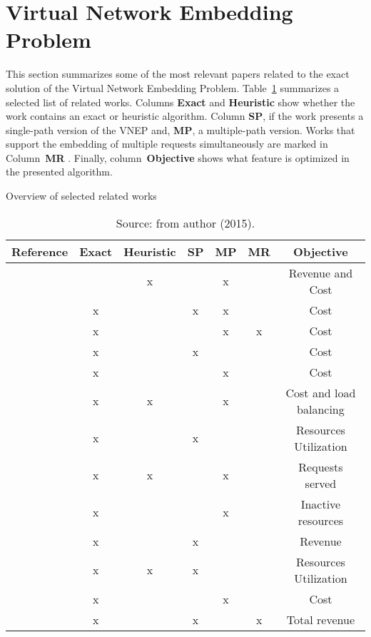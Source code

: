 \section{Virtual Network Embedding Problem}
\label{sec:relvnep}
This section summarizes some of the most relevant papers related to the exact solution of the Virtual Network Embedding Problem. 
Table~\ref{tab:papers} summarizes a selected list of related works.
Columns \textbf{Exact} and \textbf{Heuristic} show whether the work contains an exact or heuristic algorithm.
Column \textbf{SP}, if the work presents a single-path version of the VNEP and, \textbf{MP}, a multiple-path version.
Works that support the embedding of multiple requests simultaneously are marked in Column~\textbf{MR} .
Finally, column~\textbf{Objective} shows what feature is optimized in the presented algorithm.

\begin{table}[h]
\begin{center}
  \footnotesize
  \caption{Overview of selected related works\label{tab:papers}}
  \begin{tabular}{l | c c | c c | c | c}
  \hline
  Reference                 & Exact  & Heuristic  & SP  &  MP  & MR & Objective \\
  \hline
   \citet{Yu2008}           &        & x          &     & x    &    & Revenue and Cost  \\
   \citet{Lischka:2009}     & x      &            & x   & x    &    & Cost    \\
   \citet{Houidi:2011}      & x      &            &     & x    & x  & Cost    \\
   \citet{Trinh:2011}       & x      &            & x   &      &    & Cost    \\
   \citet{infuhr:2011}      & x      &            &     & x    &    & Cost    \\
   \citet{Chowdhury:2012}   & x      & x          &     & x    &    & Cost and load balancing \\
   \citet{Buriol:2012}      & x      &            & x   &      &    & Resources Utilization   \\
   \citet{Pages:2012}       & x      & x          &     & x    &    & Requests served    \\
   \citet{Botero:2012}      & x      &            &     & x    &    & Inactive resources \\
   \citet{Jarray2012}       & x      &            & x   &      &    & Revenue \\
   \citet{Alkmim2013}       & x      & x          & x   &      &    & Resources Utilization \\
   \citet{hu:2013}          & x      &            &     & x    &    & Cost    \\
   \citet{Guerzoni:2014}    & x      &            & x   &      & x  & Total revenue  \\
   \hline
  \end{tabular}\caption*{Source: from author (2015).}
\end{center}
\end{table}


